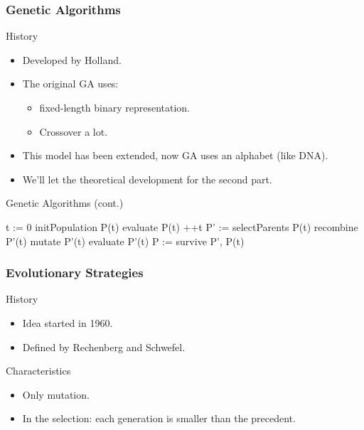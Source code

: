 \begin{frame}
  \frametitle{Genetic Algorithms}
  \begin{block}{History}
    \begin{itemize}
    \item Developed by Holland\cite{holland1992}.
    \item The original GA uses:
      \begin{itemize}
        \item fixed-length binary representation.
        \item Crossover a lot.
      \end{itemize}
    \item This model has been extended, now GA uses an alphabet (like DNA).
    \item We'll let the theoretical development for the second part.
    \end{itemize}
  \end{block}
\end{frame}

\begin{frame}{Genetic Algorithms (cont.)}
  \begin{algorithm}[H]
    \caption{Genetic Algorithm}
    \begin{algorithmic}
      \State t := 0
      \State initPopulation P(t)
      \State evaluate P(t)
        \State ++t
        \State P' := selectParents P(t)
        \State recombine P'(t)
        \State mutate P'(t)
        \State evaluate P'(t)
        \State P := survive P', P(t)
      \EndWhile
    \end{algorithmic}
  \end{algorithm}
\end{frame}

\begin{frame}
  \frametitle{Evolutionary Strategies}
  \begin{block}{History}
    \begin{itemize}
    \item Idea started in 1960.
    \item Defined by Rechenberg\cite{Rechenberg.1975} and Schwefel\cite{Schwefel.1981}.
    \end{itemize}
  \end{block}

  \begin{block}{Characteristics}
    \begin{itemize}
    \item Only mutation.
    \item In the selection: each generation is smaller than the
      precedent.
    \end{itemize}
  \end{block}
\end{frame}


